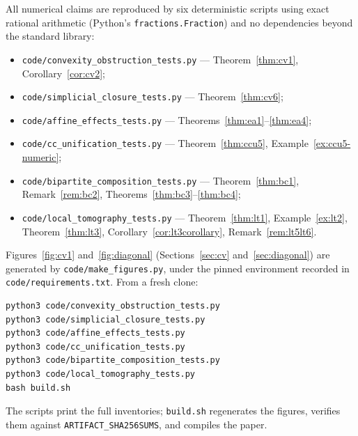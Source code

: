\documentclass[11pt,a4paper]{article}
\begin{document}
    All numerical claims are reproduced by six deterministic scripts using exact rational arithmetic
    (Python's \texttt{fractions.Fraction}) and no dependencies beyond the standard library:
    \begin{itemize}
      \item \texttt{code/convexity\_obstruction\_tests.py} --- Theorem~\ref{thm:cv1}, Corollary~\ref{cor:cv2};
      \item \texttt{code/simplicial\_closure\_tests.py} --- Theorem~\ref{thm:cv6};
      \item \texttt{code/affine\_effects\_tests.py} --- Theorems~\ref{thm:ea1}--\ref{thm:ea4};
      \item \texttt{code/cc\_unification\_tests.py} --- Theorem~\ref{thm:ccu5}, Example~\ref{ex:ccu5-numeric};
      \item \texttt{code/bipartite\_composition\_tests.py} --- Theorem~\ref{thm:bc1},
      Remark~\ref{rem:bc2}, Theorems~\ref{thm:bc3}--\ref{thm:bc4};
      \item \texttt{code/local\_tomography\_tests.py} --- Theorem~\ref{thm:lt1}, Example~\ref{ex:lt2},
      Theorem~\ref{thm:lt3}, Corollary~\ref{cor:lt3corollary}, Remark~\ref{rem:lt5lt6}.
    \end{itemize}
    Figures~\ref{fig:cv1} and~\ref{fig:diagonal} (Sections~\ref{sec:cv} and~\ref{sec:diagonal}) are generated
    by \texttt{code/make\_figures.py}, under the pinned environment recorded in
    \texttt{code/requirements.txt}.
    From a fresh clone:
    \begin{verbatim}
python3 code/convexity_obstruction_tests.py
python3 code/simplicial_closure_tests.py
python3 code/affine_effects_tests.py
python3 code/cc_unification_tests.py
python3 code/bipartite_composition_tests.py
python3 code/local_tomography_tests.py
bash build.sh
    \end{verbatim}
    The scripts print the full inventories; \texttt{build.sh} regenerates the figures, verifies them against
    \texttt{ARTIFACT\_SHA256SUMS}, and compiles the paper.

  
  
\end{document}
